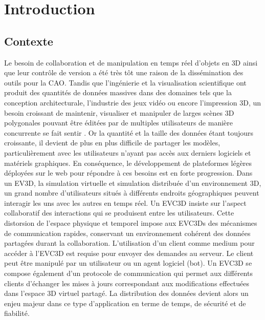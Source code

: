 \chapter{Introduction}
\chaptertable
\section{Contexte}
Le besoin de collaboration et de manipulation en temps réel d'objets en \gls{3D} 
ainsi que leur contrôle de version a été très tôt une raison de la dissémination des 
outils pour la \gls{CAO}. Tandis que l'ingénierie et la visualisation scientifique ont 
produit des quantités de données massives dans des domaines tels que la 
conception architecturale, l'industrie des jeux vidéo ou encore l'impression \gls{3D}, un 
besoin croissant de maintenir, visualiser et manipuler de larges scènes \gls{3D} 
polygonales pouvant être éditées par de multiples utilisateurs de manière 
concurrente se fait sentir \cite{Chandrasegaran2013,Wu2014}. Or la quantité et la taille des données 
étant toujours croissante, il devient de plus en plus difficile de partager les 
modèles, particulièrement avec les utilisateurs n'ayant pas accès aux derniers 
logiciels et matériels graphiques. En conséquence,
le développement de plateformes légères déployées sur le web pour répondre à ces 
besoins est en forte progression. 
Dans un \gls{EV3D}, la simulation virtuelle et simulation distribuée d'un 
environnement \gls{3D}, un grand nombre d'utilisateurs situés à différents endroits 
géographiques peuvent 
interagir les uns avec les autres en temps réel. Un \gls{EVC3D} insiste sur l'aspect collaboratif des interactions qui se produisent entre les utilisateurs.
Cette distorsion de l'espace physique et temporel impose aux \glspl{EVC3D} des 
mécanismes de communication rapides, conservant un environnement cohérent
des données partagées durant la collaboration. 
L'utilisation d'un client comme medium pour 
accéder à l'\gls{EVC3D} est requise pour envoyer des demandes au serveur. Le 
client peut être manipulé par un utilisateur ou un agent logiciel (bot).
Un \gls{EVC3D} se compose également d'un protocole de communication qui 
permet aux différents clients d'échanger les mises à jours correspondant aux 
modifications effectuées dans l'espace \gls{3D} virtuel partagé. La distribution des 
données devient alors un enjeu majeur dans ce type d'application en terme de 
temps, de sécurité et de fiabilité. 



